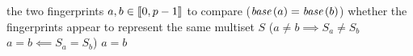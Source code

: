 \begin{algorithmic}[1]
  \In the two fingerprints \( a, b \in \llbracket0, p - 1\rrbracket \) to compare (\( \base (a) = \base (b) \))
  \Out whether the fingerprints appear to represent the same multiset \( S \) (\( a \neq b \implies S_{a} \neq S_{b} \) \LAnd{} \( a = b \impliedby S_{a} = S_{b} \))
    \State \Return \( a = b \)
  \EndFunction
\end{algorithmic}
